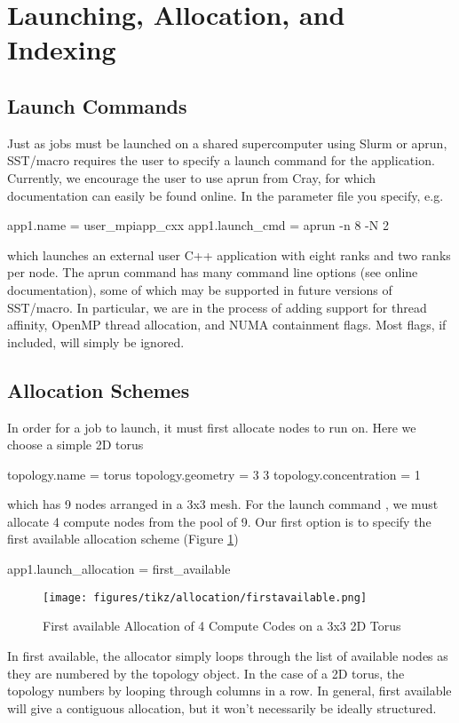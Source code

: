 
\section{Launching, Allocation, and Indexing}
\label{sec:tutorial:launchetc}

\subsection{Launch Commands}
\label{subsec:tutorial:launch}
Just as jobs must be launched on a shared supercomputer using Slurm or aprun, 
SST/macro requires the user to specify a launch command for the application.
Currently, we encourage the user to use aprun from Cray, for which documentation can easily be found online.
In the parameter file you specify, e.g.

\begin{ViFile}
app1.name = user_mpiapp_cxx
app1.launch_cmd = aprun -n 8 -N 2
\end{ViFile}
which launches an external user C++ application with eight ranks and two ranks per node.
The aprun command has many command line options (see online documentation), some of which may be supported in future versions of SST/macro.  In particular, we are in the process of adding support for thread affinity, OpenMP thread allocation, and NUMA containment flags.  Most flags, if included, will simply be ignored.

\subsection{Allocation Schemes}
\label{subsec:tutorial:allocation}
In order for a job to launch, it must first allocate nodes to run on. Here we choose a simple 2D torus

\begin{ViFile}
topology.name = torus
topology.geometry = 3 3
topology.concentration = 1
\end{ViFile}
which has 9 nodes arranged in a 3x3 mesh.  
For the launch command , we must allocate 4 compute nodes from the pool of 9.
Our first option is to specify the first available allocation scheme (Figure \ref{fig:allocation:first_available})

\begin{ViFile}
app1.launch_allocation = first_available
\end{ViFile}
\begin{figure}[h]
\centering
\texttt{[image: figures/tikz/allocation/firstavailable.png]}
\caption{First available Allocation of 4 Compute Codes on a 3x3 2D Torus}
\label{fig:allocation:first_available}
\end{figure}
In first available, the allocator simply loops through the list of available nodes as they are numbered by the topology object.
In the case of a 2D torus, the topology numbers by looping through columns in a row.
In general, first available will give a contiguous allocation, but it won't necessarily be ideally structured.

